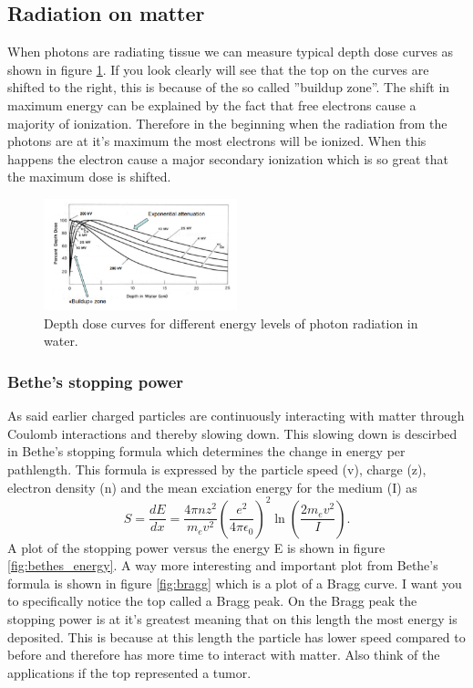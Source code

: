 \documentclass[jmp, amsmath, amssymb, reprint]{article}
\numberwithin{equation}{section}
\newcommand{\lp}{\left(}
\newcommand{\rp}{\right)}
\begin{document}
\begin{multicols}{2}
\subsection{Radiation on matter}

When photons are radiating tissue we can measure typical depth dose curves as shown in figure \ref{fig:depth_dose}. If you look clearly will see that the top on the curves are shifted to the right, this is because of the so called ''buildup zone''. The shift in maximum energy can be explained by the fact that free electrons cause a majority of ionization. Therefore in the beginning when the radiation from the photons are at it's maximum the most electrons will be ionized. When this happens the electron cause a major secondary ionization which is so great that the maximum dose is shifted.

\begin{figure}[H]
	\centering
  	\includegraphics[width=0.50\textwidth]{dept_dose.png}
	\caption{Depth dose curves for different energy levels of photon radiation in water.}
	\label{fig:depth_dose}
\end{figure}

\subsubsection{Bethe's stopping power}

As said earlier charged particles are continuously interacting with matter through Coulomb interactions and thereby slowing down. This slowing down is descirbed in Bethe's stopping formula which determines the change in energy per pathlength. This formula is expressed by the particle speed (v), charge (z), electron density (n) and the mean exciation energy for the medium (I) as
\begin{equation}\label{eq:05}
S=\frac{dE}{dx}=\frac{4\pi nz^2}{m_ev^2}\lp\frac{e^2}{4\pi\epsilon_0}\rp^2\ln(\frac{2m_ev^2}{I}).
\end{equation}
A plot of the stopping power versus the energy E is shown in figure \ref{fig:bethes_energy}. A way more interesting and important plot from Bethe's formula is shown in figure \ref{fig:bragg} which is a plot of a Bragg curve. I want you to specifically notice the top called a Bragg peak. On the Bragg peak the stopping power is at it's greatest meaning that on this length the most energy is deposited. This is because at this length the particle has lower speed compared to before and therefore has more time to interact with matter. Also think of the applications if the top represented a tumor.



\end{multicols}
\end{document}
